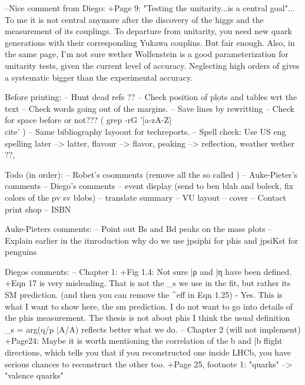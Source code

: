 --Nice comment from Diego: +Page 9: "Testing the unitarity...is a central goal"... To me it is not central anymore after the discovery
of the higgs and the measurement of its couplings. To departure from unitarity, you need new quark
generations with their corresponding Yukawa couplins. But fair enough.
 Also, in the same page, I'm not sure wether Wolfenstein is a good parameterization for unitarity tests,
given the current level of accuracy. Neglecting high orders of \lambda gives a systematic bigger than
the experimental accuracy.


Before printing:
-- Hunt dead refs ??
-- Check position of plots and tables wrt the text
-- Check words going out of the margins.
-- Save lines by rewritting
-- Check for space before \cite{} or not??? ( grep -rG  '[a-zA-Z]\\cite' )
-- Same bibliography layoout for techreports.
-- Spell check:  Use US eng spelling  later --> latter, flavour --> flavor, peaking --> reflection, weather wether ??,

Todo (in order):
-- Robet's coomments (remove all the so called )
-- Auke-Pieter's comments
-- Diego's comments
-- event display (send to ben blah and boleck, fix colors of the pv sv blobs)
-- translate summary
-- VU layout
-- cover
-- Contact print shop
-- ISBN

Auke-Pieters comments:
-- Point out Bs and Bd peaks on the mass plots
-- Explain earlier in the itnroduction why do we use jpsiphi for phis and jpsiKst for penguins

Diegos comments:
-- Chapter 1:
  +Fig 1.4: Not sure \bar{ρ} and \bar{η} have been defined.
  +Eqn 17 is very misleading. That is not the \phi_s we use in the fit, but rather its
          SM prediction. (and then you can remove the ^{eff} in Eqn 1.25)
  - Yes. This is what I want to show here, the sm prediction. I do not want to go into
          details of the phis measurement. The thesis is not about phis I think the usual definition \phi_s = arg(q/p \bar{A}/{A}) reflects better what we do.
-- Chapter 2 (will not implement)
  +Page24: Maybe it is worth mentioning the correlation of the b and \bar{b} flight directions,
           which tells you that if you reconstructed one inside LHCb, you have serious chances to reconstruct the other too.
  +Page 25, footnote 1: "quarks" --> "valence quarks"

